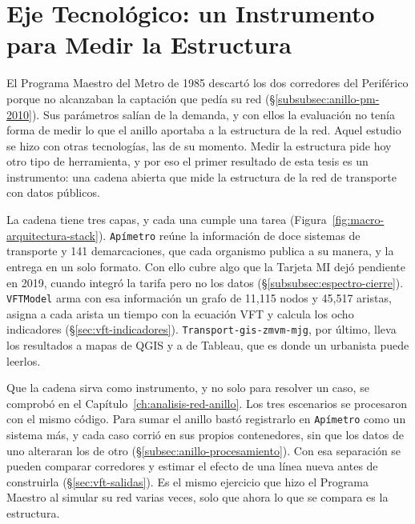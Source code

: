 \section{Eje Tecnológico: un Instrumento para Medir la Estructura}
\label{sec:conclusiones-tecnologico}

El Programa Maestro del Metro de 1985 descartó los dos corredores del
Periférico porque no alcanzaban la captación que pedía su red
(§\ref{subsubsec:anillo-pm-2010}). Sus parámetros salían de la demanda, y con
ellos la evaluación no tenía forma de medir lo que el anillo aportaba a la
estructura de la red. Aquel estudio se hizo con otras tecnologías, las de su
momento. Medir la estructura pide hoy otro tipo de herramienta, y por eso el
primer resultado de esta tesis es un instrumento: una cadena abierta que mide
la estructura de la red de transporte con datos públicos.

La cadena tiene tres capas, y cada una cumple una tarea
(Figura~\ref{fig:macro-arquitectura-stack}). \texttt{Apímetro} reúne la
información de doce sistemas de transporte y 141 demarcaciones, que cada
organismo publica a su manera, y la entrega en un solo formato. Con ello cubre
algo que la Tarjeta MI dejó pendiente en 2019, cuando integró la tarifa pero no
los datos (§\ref{subsubsec:espectro-cierre}). \texttt{VFTModel} arma con esa
información un grafo de 11,115 nodos y 45,517 aristas, asigna a cada arista un
tiempo con la ecuación VFT y calcula los ocho indicadores
(§\ref{sec:vft-indicadores}). \texttt{Transport-gis-zmvm-mjg}, por último,
lleva los resultados a mapas de QGIS y a  de Tableau, que
es donde un urbanista puede leerlos.

Que la cadena sirva como instrumento, y no solo para resolver un caso, se
comprobó en el Capítulo~\ref{ch:analisis-red-anillo}. Los tres escenarios se
procesaron con el mismo código. Para sumar el anillo bastó registrarlo en
\texttt{Apímetro} como un sistema más, y cada caso corrió en sus propios
contenedores, sin que los datos de uno alteraran los de otro
(§\ref{subsec:anillo-procesamiento}). Con esa separación se pueden comparar
corredores y estimar el efecto de una línea nueva antes de construirla
(§\ref{sec:vft-salidas}). Es el mismo ejercicio que hizo el Programa Maestro al
simular su red varias veces, solo que ahora lo que se compara es la estructura.

